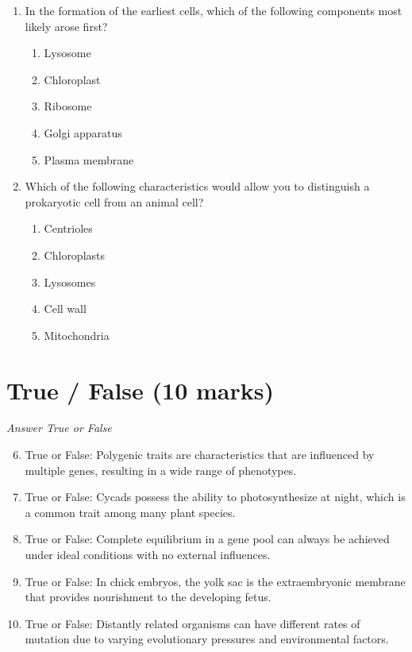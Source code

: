 \documentclass[12pt]{article}
\begin{document}
\begin{enumerate}[label=\arabic*.]
\begin{enumerate}[label=(\alph*)]
\end{enumerate}
\item In the formation of the earliest cells, which of the following components most likely arose first?
\begin{enumerate}[label=(\alph*)]
    \item Lysosome
    \item Chloroplast
    \item Ribosome
    \item Golgi apparatus
    \item Plasma membrane
\end{enumerate}
\item Which of the following characteristics would allow you to distinguish a prokaryotic cell from an animal cell?
\begin{enumerate}[label=(\alph*)]
    \item Centrioles
    \item Chloroplasts
    \item Lysosomes
    \item Cell wall
    \item Mitochondria
\end{enumerate}
\end{enumerate}

\section*{True / False (10 marks)}
\textit{Answer True or False}
\begin{enumerate}[label=\arabic*.]
\setcounter{enumi}{5}
\item True or False: Polygenic traits are characteristics that are influenced by multiple genes, resulting in a wide range of phenotypes.
\item True or False: Cycads possess the ability to photosynthesize at night, which is a common trait among many plant species.
\item True or False: Complete equilibrium in a gene pool can always be achieved under ideal conditions with no external influences.
\item True or False: In chick embryos, the yolk sac is the extraembryonic membrane that provides nourishment to the developing fetus.
\item True or False: Distantly related organisms can have different rates of mutation due to varying evolutionary pressures and environmental factors.
\end{enumerate}
\end{document}
